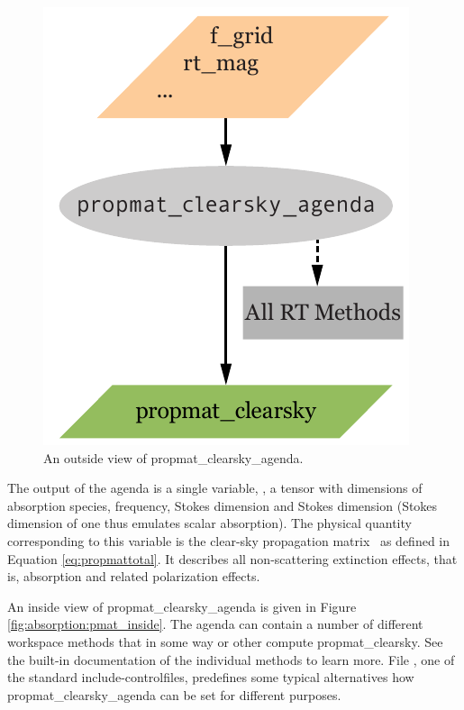 \begin{figure}
 \begin{center}
  \includegraphics[scale=0.7]{propmat_clearsky_agenda}
  \caption{An outside view of propmat\_clearsky\_agenda.}
  \label{fig:absorption:pmat_outside}
 \end{center}
\end{figure}

The output of the agenda is a single variable,
, a tensor with dimensions of absorption
species, frequency, Stokes dimension and Stokes dimension (Stokes
dimension of one thus emulates scalar absorption).  The physical
quantity corresponding to this variable is the clear-sky propagation
matrix \, as defined in Equation
\ref{eq:propmattotal}. It describes all non-scattering extinction
effects, that is, absorption and related polarization effects.

An inside view of propmat\_clearsky\_agenda is given in Figure
\ref{fig:absorption:pmat_inside}.  The agenda can contain a number of
different workspace methods that in some way or other compute
propmat\_clearsky. See the built-in documentation of the individual
methods to learn more. File , one of the
standard include-controlfiles, predefines some typical alternatives
how propmat\_clearsky\_agenda can be set for different purposes.

